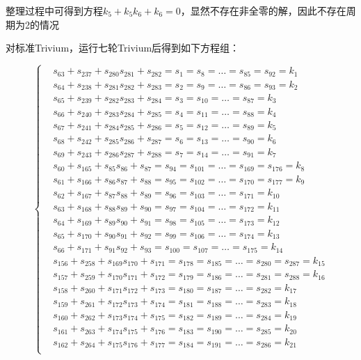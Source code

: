 整理过程中可得到方程$k_{5}+k_{5}k_{6}+k_{6}=0$，显然不存在非全零的解，因此不存在周期为2的情况

\vspace{3ex}

对标准Trivium，运行七轮Trivium后得到如下方程组：

\begin{equation}
\left\{
\begin{aligned}
&s_{63}+s_{237}+s_{280}s_{281}+s_{282}=s_{1}=s_{8}=\ldots=s_{85}=s_{92}=k_{1}\\
&s_{64}+s_{238}+s_{281}s_{282}+s_{283}=s_{2}=s_{9}=\ldots=s_{86}=s_{93}=k_{2}\\
&s_{65}+s_{239}+s_{282}s_{283}+s_{284}=s_{3}=s_{10}=\ldots=s_{87}=k_{3}\\
&s_{66}+s_{240}+s_{283}s_{284}+s_{285}=s_{4}=s_{11}=\ldots=s_{88}=k_{4}\\
&s_{67}+s_{241}+s_{284}s_{285}+s_{286}=s_{5}=s_{12}=\ldots=s_{89}=k_{5}\\
&s_{68}+s_{242}+s_{285}s_{286}+s_{287}=s_{6}=s_{13}=\ldots=s_{90}=k_{6}\\
&s_{69}+s_{243}+s_{286}s_{287}+s_{288}=s_{7}=s_{14}=\ldots=s_{91}=k_{7}\\
&s_{60}+s_{165}+s_{85}s_{86}+s_{87}=s_{94}=s_{101}=\ldots=s_{169}=s_{176}=k_{8}\\
&s_{61}+s_{166}+s_{86}s_{87}+s_{88}=s_{95}=s_{102}=\ldots=s_{170}=s_{177}=k_{9}\\
&s_{62}+s_{167}+s_{87}s_{88}+s_{89}=s_{96}=s_{103}=\ldots=s_{171}=k_{10}\\
&s_{63}+s_{168}+s_{88}s_{89}+s_{90}=s_{97}=s_{104}=\ldots=s_{172}=k_{11}\\
&s_{64}+s_{169}+s_{89}s_{90}+s_{91}=s_{98}=s_{105}=\ldots=s_{173}=k_{12}\\
&s_{65}+s_{170}+s_{90}s_{91}+s_{92}=s_{99}=s_{106}=\ldots=s_{174}=k_{13}\\
&s_{66}+s_{171}+s_{91}s_{92}+s_{93}=s_{100}=s_{107}=\ldots=s_{175}=k_{14}\\
&s_{156}+s_{258}+s_{169}s_{170}+s_{171}=s_{178}=s_{185}=\ldots=s_{280}=s_{287}=k_{15}\\
&s_{157}+s_{259}+s_{170}s_{171}+s_{172}=s_{179}=s_{186}=\ldots=s_{281}=s_{288}=k_{16}\\
&s_{158}+s_{260}+s_{171}s_{172}+s_{173}=s_{180}=s_{187}=\ldots=s_{282}=k_{17}\\
&s_{159}+s_{261}+s_{172}s_{173}+s_{174}=s_{181}=s_{188}=\ldots=s_{283}=k_{18}\\
&s_{160}+s_{262}+s_{173}s_{174}+s_{175}=s_{182}=s_{189}=\ldots=s_{284}=k_{19}\\
&s_{161}+s_{263}+s_{174}s_{175}+s_{176}=s_{183}=s_{190}=\ldots=s_{285}=k_{20}\\
&s_{162}+s_{264}+s_{175}s_{176}+s_{177}=s_{184}=s_{191}=\ldots=s_{286}=k_{21}\\
\end{aligned}
\right.
\end{equation}


